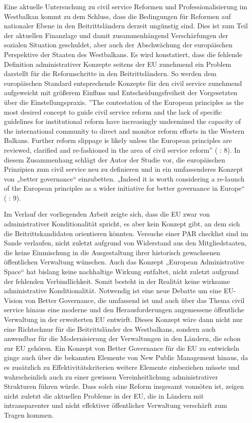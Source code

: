 Eine aktuelle Untersuchung zu civil service Reformen und Professionalisierung im Westbalkan kommt zu dem Schluss, dass die Bedingungen für Reformen auf nationaler Ebene in den Beitrittsländern derzeit ungünstig sind. Dies ist zum Teil der aktuellen Finanzlage und damit zusammenhängend Verschärfungen der sozialen Situation geschuldet, aber auch der Abschwächung der europäischen Perspektive der Staaten des Westbalkans. Es wird konstatiert, dass die fehlende Definition administrativer Konzepte seitens der EU zunehmend ein Problem darstellt für die Reformschritte in den Beitrittsländern. So werden dem europäischen Standard entsprechende Konzepte für den civil service zunehmend aufgeweicht mit größerem Einfluss und Entscheidungsfreiheit der Vorgesetzten über die Einstellungspraxis. ”The contestation of the European principles as the most desired concept to guide civil service reform and the lack of specific guidelines for institutional reform have increasingly undermined the capacity of the international community to direct and monitor reform efforts in the Western Balkans. Further reform slippage is likely unless the European principles are reviewed, clarified and re-fashioned in the area of civil service reform” (\cite{meyersah12} : 8). In diesem Zusammenhang schlägt der Autor der Studie vor, die europäischen Prinzipien zum civil service neu zu definieren und in ein umfassenderes Konzept von „better governance“ einzubetten. „Indeed it is worth considering a re-launch of the European principles as a wider initiative for better governance in Europe“ (\cite{meyersah12} : 9). \par
Im Verlauf der vorliegenden Arbeit zeigte sich, dass die EU zwar von administrativer Konditionalität spricht, es aber kein Konzept gibt, an dem sich die Beitrittskandidaten orientieren könnten. Versuche einer PAR checklist sind im Sande verlaufen, nicht zuletzt aufgrund von Widerstand aus den Mitgliedstaaten, die keine Einmischung in die Ausgestaltung ihrer historisch gewachsenen öffentlichen Verwaltung wünschen. Auch das Konzept „European Administrative Space“ hat bislang keine nachhaltige Wirkung entfaltet, nicht zuletzt aufgrund der fehlenden Verbindlichkeit. Somit besteht in der Realität keine wirksame administrative Konditionalität. Notwendig ist eine neue Debatte um eine EU-Vision von Better Governance, die umfassend ist und auch über das Thema civil service hinaus eine moderne und den Herausforderungen angemessene öffentliche Verwaltung in der erweiterten EU entwirft. Dieses Konzept wäre dann nicht nur eine Richtschnur für die Beitrittsländer des Westbalkans, sondern auch anwendbar für die Modernisierung der Verwaltungen in den Ländern, die schon zur EU gehören. Ein Konzept von Better Governance für die EU zu entwickeln ginge auch über die bekannten Elemente von New Public Management hinaus, da es zusätzlich zu Effektivitätskriterien weitere Elemente einbeziehen müsste und wahrscheinlich auch zu einer gewissen Vereinheitlichung administrativer Strukturen führen würde. Dass solch eine Reform insgesamt vonnöten ist, zeigen nicht zuletzt die aktuellen Probleme in der EU, die in Ländern mit intransparenter und nicht effektiver öffentlicher Verwaltung verschärft zum Tragen kommen.

